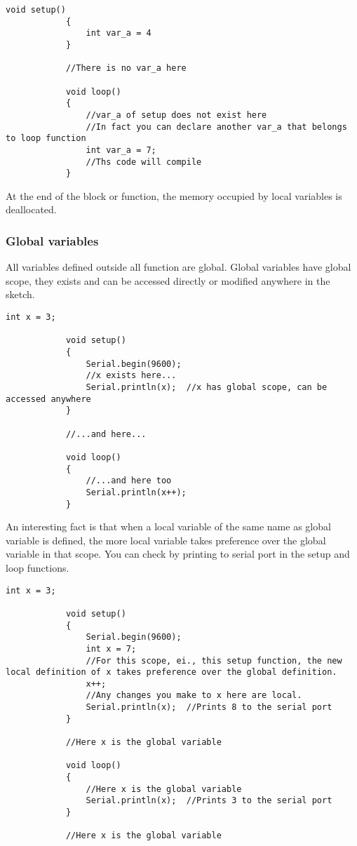 \documentclass{article}
\begin{document}
			\begin{lstlisting}[gobble=12]
			void setup()
			{
				int var_a = 4
			}

			//There is no var_a here

			void loop()
			{
				//var_a of setup does not exist here
				//In fact you can declare another var_a that belongs to loop function
				int var_a = 7;
				//Ths code will compile
			}
			\end{lstlisting}

			At the end of the block or function, the memory occupied by local variables is deallocated.

		\subsubsection{Global variables}

			All variables defined outside all function are global. Global variables have global scope, they exists and can be accessed directly or modified anywhere in the sketch.

			\begin{lstlisting}[gobble=12]
			int x = 3;

			void setup()
			{
				Serial.begin(9600);
				//x exists here...
				Serial.println(x);	//x has global scope, can be accessed anywhere
			}

			//...and here...

			void loop()
			{
				//...and here too
				Serial.println(x++);
			}
			\end{lstlisting}

			An interesting fact is that when a local variable of the same name as global variable is defined, the more local variable takes preference over the global variable in that scope. You can check by printing  to serial port in the setup and loop functions.

			\begin{lstlisting}[gobble=12]
			int x = 3;

			void setup()
			{
				Serial.begin(9600);
				int x = 7;
				//For this scope, ei., this setup function, the new local definition of x takes preference over the global definition.
				x++;
				//Any changes you make to x here are local.
				Serial.println(x);	//Prints 8 to the serial port
			}

			//Here x is the global variable

			void loop()
			{
				//Here x is the global variable
				Serial.println(x);	//Prints 3 to the serial port
			}

			//Here x is the global variable
			\end{lstlisting}
\end{document}
